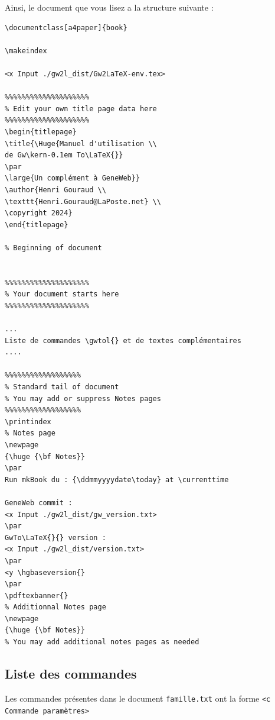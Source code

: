 Ainsi, le document que vous lisez a la structure suivante :

\begin{verbatim}
\documentclass[a4paper]{book}

\makeindex

<x Input ./gw2l_dist/Gw2LaTeX-env.tex>

%%%%%%%%%%%%%%%%%%%%
% Edit your own title page data here
%%%%%%%%%%%%%%%%%%%%
\begin{titlepage}
\title{\Huge{Manuel d'utilisation \\
de Gw\kern-0.1em To\LaTeX{}}
\par
\large{Un complément à GeneWeb}}
\author{Henri Gouraud \\
\texttt{Henri.Gouraud@LaPoste.net} \\
\copyright 2024}
\end{titlepage}

% Beginning of document


%%%%%%%%%%%%%%%%%%%%
% Your document starts here
%%%%%%%%%%%%%%%%%%%%

...
Liste de commandes \gwtol{} et de textes complémentaires
....

%%%%%%%%%%%%%%%%%%
% Standard tail of document
% You may add or suppress Notes pages
%%%%%%%%%%%%%%%%%%
\printindex
% Notes page
\newpage
{\huge {\bf Notes}}
\par
Run mkBook du : {\ddmmyyyydate\today} at \currenttime

GeneWeb commit :
<x Input ./gw2l_dist/gw_version.txt>
\par
GwTo\LaTeX{}{} version :
<x Input ./gw2l_dist/version.txt>
\par
<y \hgbaseversion{}
\par
\pdftexbanner{}
% Additionnal Notes page
\newpage
{\huge {\bf Notes}}
% You may add additional notes pages as needed

\end{verbatim}


\subsection{Liste des commandes \gwtol{}}
Les commandes \gwtol{} présentes dans le document \verb|famille.txt| ont la forme
\verb|<c Commande paramètres>|

